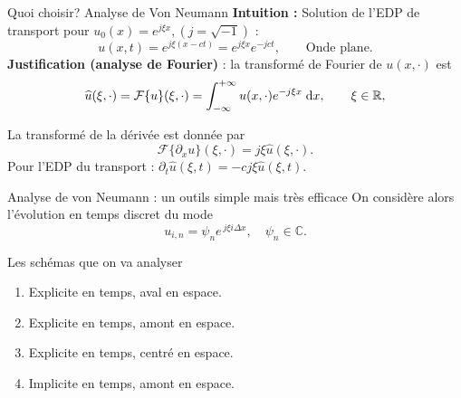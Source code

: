 \documentclass[aspectratio=169, french]{beamer}
\newcommand{\bbR}{\mathbb{R}}
\newcommand{\bbC}{\mathbb{C}}
\begin{document}
\begin{frame}{Quoi choisir? Analyse de Von Neumann}
	\textbf{Intuition : } Solution de l'EDP de transport pour $u_0(x) = e^{j \xi x}, (j = \sqrt{-1})$ :
	\begin{equation*}
	u(x, t) = e^{j \xi(x-ct)} = e^{j \xi x}e^{-jct}, \qquad \text{Onde plane.}
	\end{equation*}
	\textbf{Justification (analyse de Fourier)} :  la transformé de Fourier de $u(x, \cdot)$ est
	\begin{equation*}
		\widehat{u}(\xi, \cdot) = \mathcal{F}\{u\}(\xi, \cdot) = \int_{-\infty}^{+\infty} u(x, \cdot)e^{- j \xi x}  \d{x}, \qquad \xi \in \bbR,
	\end{equation*}

La transformé de la dérivée est donnée par
\begin{equation*}
\mathcal{F}\{\partial_{x} u\}(\xi, \cdot) = j \xi \widehat{u}(\xi, \cdot).
\end{equation*}
	Pour l'EDP du transport : $\partial_t{\widehat{u}}(\xi, t) = -c  j  \xi \widehat{u}(\xi, t).$
\begin{block}{Analyse de von Neumann : un outils simple mais très efficace}
		On considère alors l'évolution en temps discret du mode
		\begin{equation*}
			u_{i, n} = \psi_n e^{\, j \xi  i  \Delta x}, \quad \psi_n \in \bbC.
		\end{equation*}
\end{block}
\end{frame}

\begin{frame}{Les schémas que on va analyser}
\begin{enumerate}
	\item Explicite en temps, aval en espace.
	\item Explicite en temps, amont en espace.
	\item Explicite en temps, centré en espace.
	\item Implicite en temps, amont en espace.
\end{enumerate}
\end{frame}
\end{document}

